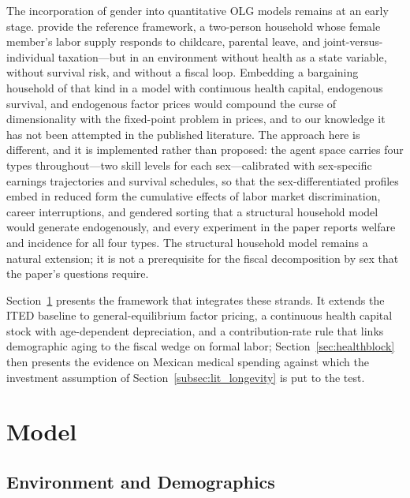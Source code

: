 \documentclass[12pt,a4paper]{article}
\begin{document}
The incorporation of gender into quantitative OLG models remains at an early stage. \citet{FehrKindermann2018} provide the reference framework, a two-person household whose female member's labor supply responds to childcare, parental leave, and joint-versus-individual taxation---but in an environment without health as a state variable, without survival risk, and without a fiscal loop. Embedding a bargaining household of that kind in a model with continuous health capital, endogenous survival, and endogenous factor prices would compound the curse of dimensionality with the fixed-point problem in prices, and to our knowledge it has not been attempted in the published literature. The approach here is different, and it is implemented rather than proposed: the agent space carries four types throughout---two skill levels for each sex---calibrated with sex-specific earnings trajectories and survival schedules, so that the sex-differentiated profiles embed in reduced form the cumulative effects of labor market discrimination, career interruptions, and gendered sorting that a structural household model would generate endogenously, and every experiment in the paper reports welfare and incidence for all four types. The structural household model remains a natural extension; it is not a prerequisite for the fiscal decomposition by sex that the paper's questions require.

Section~\ref{sec:model} presents the framework that integrates these strands. It extends the ITED baseline \citep{CortesEtAl2024} to general-equilibrium factor pricing, a continuous health capital stock with age-dependent depreciation, and a contribution-rate rule that links demographic aging to the fiscal wedge on formal labor; Section~\ref{sec:healthblock} then presents the evidence on Mexican medical spending against which the investment assumption of Section~\ref{subsec:lit_longevity} is put to the test.

\bigskip

\section{Model}
\label{sec:model}

\subsection{Environment and Demographics}
\label{subsec:environment}
\end{document}
